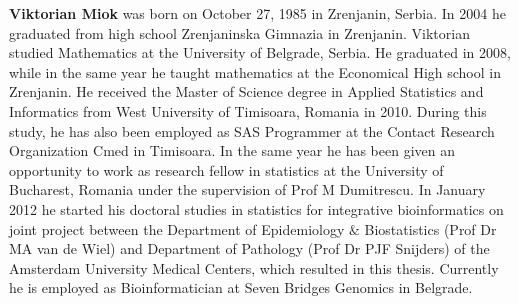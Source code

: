 

\begin{biography}


{\bf Viktorian Miok} was born on October 27, 1985 in Zrenjanin, Serbia. In 2004 he graduated from high school Zrenjaninska Gimnazia in Zrenjanin. Viktorian studied Mathematics at the University of Belgrade, Serbia. He graduated in 2008, while in the same year he taught mathematics at the Economical High school in Zrenjanin. He received the Master of Science degree in Applied Statistics and Informatics from West University of Timisoara, Romania in 2010. During this study, he has also been employed as SAS Programmer at the Contact Research Organization Cmed in Timisoara. In the same year he has been given an opportunity to work as research fellow in statistics at the University of Bucharest, Romania under the supervision of Prof M Dumitrescu. In January 2012 he started his doctoral studies in statistics for integrative bioinformatics on joint project between the Department of Epidemiology $\&$ Biostatistics (Prof Dr MA van de Wiel) and Department of Pathology (Prof Dr PJF Snijders) of the Amsterdam University Medical Centers, which resulted in this thesis. Currently he is employed as Bioinformatician at Seven Bridges Genomics in Belgrade. 

\end{biography}







